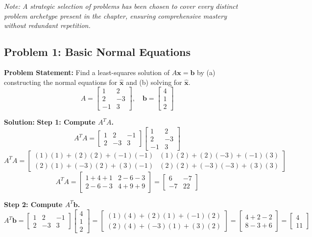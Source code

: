 \documentclass[11pt, letterpaper]{article}
\theoremstyle{definition}
\theoremstyle{remark}
\begin{document}
\textit{Note: A strategic selection of problems has been chosen to cover every distinct problem archetype present in the chapter, ensuring comprehensive mastery without redundant repetition.}

\subsection{Problem 1: Basic Normal Equations}
\textbf{Problem Statement:} Find a least-squares solution of $A\mathbf{x} = \mathbf{b}$ by (a) constructing the normal equations for $\hat{\mathbf{x}}$ and (b) solving for $\hat{\mathbf{x}}$.
\[ A = \begin{bmatrix} 1 & 2 \\ 2 & -3 \\ -1 & 3 \end{bmatrix}, \quad \mathbf{b} = \begin{bmatrix} 4 \\ 1 \\ 2 \end{bmatrix} \]

\textbf{Solution:}
\textbf{Step 1: Compute $A^T A$.}
\[
A^T A = \begin{bmatrix} 1 & 2 & -1 \\ 2 & -3 & 3 \end{bmatrix} \begin{bmatrix} 1 & 2 \\ 2 & -3 \\ -1 & 3 \end{bmatrix}
\]
\[
A^T A = \begin{bmatrix} (1)(1) + (2)(2) + (-1)(-1) & (1)(2) + (2)(-3) + (-1)(3) \\ (2)(1) + (-3)(2) + (3)(-1) & (2)(2) + (-3)(-3) + (3)(3) \end{bmatrix}
\]
\[
A^T A = \begin{bmatrix} 1 + 4 + 1 & 2 - 6 - 3 \\ 2 - 6 - 3 & 4 + 9 + 9 \end{bmatrix} = \begin{bmatrix} 6 & -7 \\ -7 & 22 \end{bmatrix}
\]

\textbf{Step 2: Compute $A^T \mathbf{b}$.}
\[
A^T \mathbf{b} = \begin{bmatrix} 1 & 2 & -1 \\ 2 & -3 & 3 \end{bmatrix} \begin{bmatrix} 4 \\ 1 \\ 2 \end{bmatrix} = \begin{bmatrix} (1)(4) + (2)(1) + (-1)(2) \\ (2)(4) + (-3)(1) + (3)(2) \end{bmatrix} = \begin{bmatrix} 4 + 2 - 2 \\ 8 - 3 + 6 \end{bmatrix} = \begin{bmatrix} 4 \\ 11 \end{bmatrix}
\]
\end{document}
